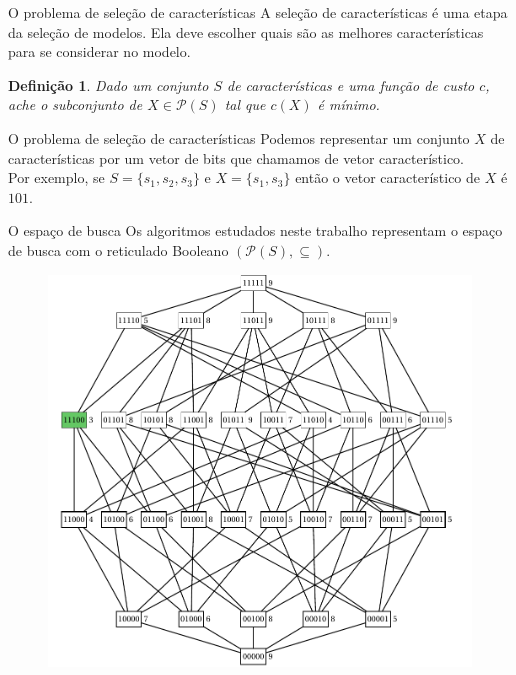 \documentclass{beamer}
\newtheorem{mydefinition}{Definição}
\newcommand{\powerset}{\mathcal{P}}
\begin{document}
\begin{frame}{O problema de seleção de características}
  A seleção de características é uma etapa da seleção de modelos. Ela
  deve escolher quais são as melhores características para se considerar
  no modelo.
  \pause
  \begin{mydefinition}
    Dado um conjunto $S$ de características e uma função 
    de custo $c$, ache o subconjunto de 
    $X \in \powerset(S)$ tal que $c (X)$ é mínimo.
  \end{mydefinition}
\end{frame}


\begin{frame}{O problema de seleção de características}
  Podemos representar um conjunto $X$ de características por um vetor
  de bits que chamamos de \alert{vetor característico}. \\
  \pause
  \vspace{1em}
  Por exemplo, se $S = \{s_1, s_2, s_3\}$ e $X = \{s_1, s_3\}$
  então o vetor característico de $X$ é $101$.
\end{frame}

\begin{frame}{O espaço de busca}
  Os algoritmos estudados neste trabalho representam o espaço de busca
  com o reticulado Booleano $(\powerset(S), \subseteq)$.
  \begin{figure}
    \centering
    \includegraphics[clip=true, width=.6\textwidth]{lattice/Boolean_lattice.pdf}
  \end{figure}
\end{frame}
\end{document}
